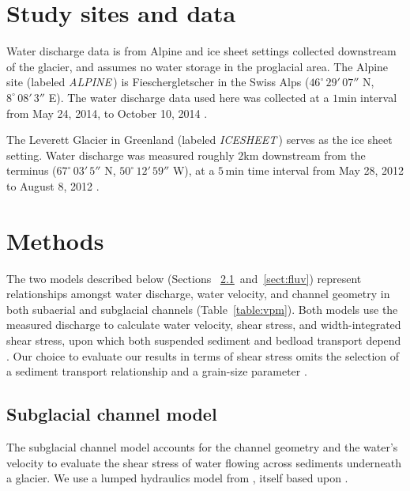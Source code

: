 \documentclass[tc, manuscript]{copernicus}
\newcommand{\alpine}{\textit{ALPINE}\,}
\newcommand{\icesheet}{\textit{ICESHEET}\,}
\begin{document}
\section{Study sites and data}
\label{sect:ss_data}

Water discharge data is from Alpine and ice sheet settings collected downstream of the glacier, and assumes no water storage in the proglacial area.
The Alpine site (labeled \alpine{}) is  Fieschergletscher in the Swiss Alps ($46^\circ\,29'\,07''$ N, $8^\circ\,08'\,3''$ E).
The water discharge data used here was collected at a $1$\unit{min} interval from May 24, 2014, to October 10, 2014 \citep[Figure~\ref{fig:model_outs}\,a][]{felix2022}.

The Leverett Glacier in Greenland (labeled \icesheet{}) serves as the ice sheet setting.
Water discharge was measured roughly $2$\unit{km} downstream from the terminus ($67^\circ\,03'\,5''$ N, $50^\circ\,12'\,59''$ W), at a $5$\,\unit{min} time interval from May 28, 2012 to August 8, 2012 \citet[][Figure~\ref{fig:model_outs}\,b]{tedstone2013}.


\section{Methods}
\label{sect:meth}
The two models described below (Sections ~\ref{sect:sub_mode}~and~\ref{sect:fluv}) represent relationships amongst water discharge, water velocity, and channel geometry in both subaerial and subglacial channels (Table~\ref{table:vpm}).
Both models use the measured discharge to calculate water velocity, shear stress, and width-integrated shear stress, upon which both suspended sediment and bedload transport depend \citep[Figure \ref{fig:cartoon}; ][]{shields1936}.
Our choice to evaluate our results in terms of shear stress omits the selection of a sediment transport relationship and a grain-size parameter \citep[e.g.][]{shields1936,meyer1948}.


\subsection{Subglacial channel  model}
\label{sect:sub_mode}

The subglacial channel model accounts for the channel geometry and the water's velocity to evaluate the shear stress of water flowing across sediments underneath a glacier.
We use a lumped hydraulics model from \citet{werder2010b}, itself based upon  \citet{clarke1996}.
\end{document}
